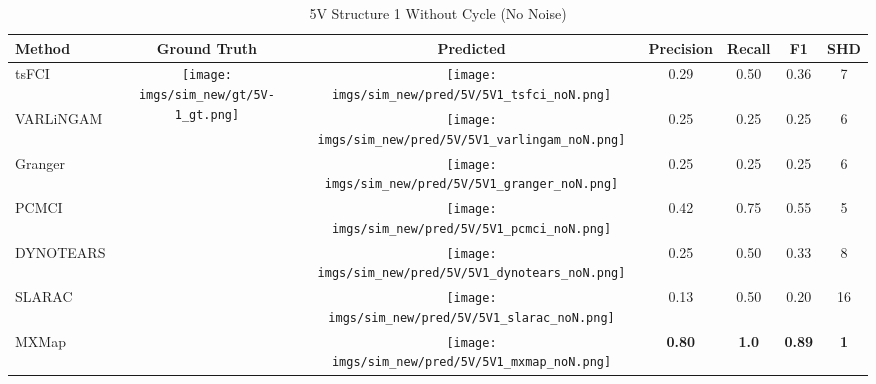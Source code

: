 \begin{table}[htb]
\begin{tabular}{l|c|c|c|c|c|c}
Method    & Ground Truth      & Predicted & Precision     & Recall       & F1            & SHD        \\ \hline
tsFCI     & \multirow{7}{*}[-9.6em]{\begin{minipage}{.17\linewidth} \centering \texttt{[image: imgs/sim\_new/gt/5V-1\_gt.png]} \end{minipage}} &  \begin{minipage}{.17\linewidth} \centering \texttt{[image: imgs/sim\_new/pred/5V/5V1\_tsfci\_noN.png]} \end{minipage}& 0.29          & 0.50         & 0.36          & 7          \\
VARLiNGAM &                   & \begin{minipage}{.17\linewidth} \centering \texttt{[image: imgs/sim\_new/pred/5V/5V1\_varlingam\_noN.png]} \end{minipage} & 0.25          & 0.25         & 0.25          & 6          \\
Granger   &                   &  \begin{minipage}{.17\linewidth} \centering \texttt{[image: imgs/sim\_new/pred/5V/5V1\_granger\_noN.png]} \end{minipage} & 0.25          & 0.25         & 0.25          & 6          \\
PCMCI     &                   &  \begin{minipage}{.17\linewidth} \centering \texttt{[image: imgs/sim\_new/pred/5V/5V1\_pcmci\_noN.png]} \end{minipage}   & 0.42          & 0.75         & 0.55          & 5          \\
DYNOTEARS &                   &  \begin{minipage}{.17\linewidth} \centering \texttt{[image: imgs/sim\_new/pred/5V/5V1\_dynotears\_noN.png]} \end{minipage}  & 0.25          & 0.50         & 0.33          & 8          \\
SLARAC    &                   &  \begin{minipage}{.17\linewidth} \centering \texttt{[image: imgs/sim\_new/pred/5V/5V1\_slarac\_noN.png]} \end{minipage}  & 0.13          & 0.50         & 0.20          & 16         \\ \cline{1-1} \cline{3-7} 
MXMap     &                   &  \begin{minipage}{.17\linewidth} \centering \texttt{[image: imgs/sim\_new/pred/5V/5V1\_mxmap\_noN.png]} \end{minipage} & \textbf{0.80} & \textbf{1.0} & \textbf{0.89} & \textbf{1}
\end{tabular}
\caption{5V Structure 1 Without Cycle (No Noise)}
\label{tab:5V1_noN}
\end{table}


